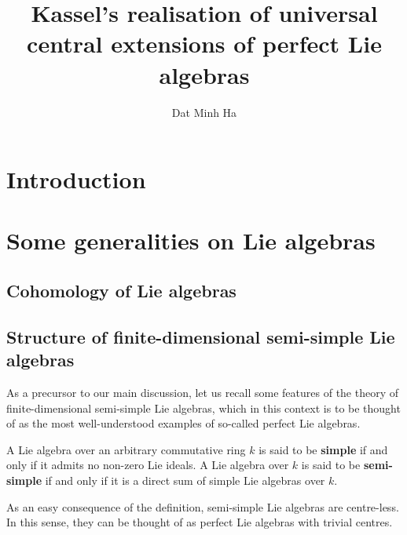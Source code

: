 

\setcounter{section}{-1}





    \title{Kassel's realisation of universal central extensions of perfect Lie algebras}
    
    \author{Dat Minh Ha}
    \maketitle
    
    \begin{abstract}
    
    \end{abstract}
    
    {
    \hypersetup{} 
    \tableofcontents %
    }

    \section{Introduction}

    \section{Some generalities on Lie algebras}
        \subsection{Cohomology of Lie algebras}
    
        \subsection{Structure of finite-dimensional semi-simple Lie algebras}
            As a precursor to our main discussion, let us recall some features of the theory of finite-dimensional semi-simple Lie algebras, which in this context is to be thought of as the most well-understood examples of so-called perfect Lie algebras. 

            \begin{definition}
                A Lie algebra over an arbitrary commutative ring $k$ is said to be \textbf{simple} if and only if it admits no non-zero Lie ideals. A Lie algebra over $k$ is said to be \textbf{semi-simple} if and only if it is a direct sum of simple Lie algebras over $k$. 
            \end{definition}
            \begin{remark}
                As an easy consequence of the definition, semi-simple Lie algebras are centre-less. In this sense, they can be thought of as perfect Lie algebras with trivial centres. 
            \end{remark}

